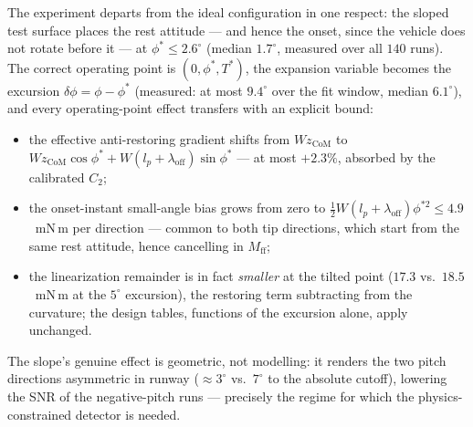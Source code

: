 The experiment departs from the ideal configuration in one respect:
the sloped test surface places the rest attitude — and hence the onset,
since the vehicle does not rotate before it — at
$\phi^* \le 2.6^\circ$ (median $1.7^\circ$, measured over all $140$
runs). The correct operating point is $(0,\phi^*,T^*)$, the expansion
variable becomes the excursion $\delta\phi = \phi - \phi^*$ (measured:
at most $9.4^\circ$ over the fit window, median $6.1^\circ$), and
every operating-point effect transfers with an explicit bound:
\begin{itemize}
\item the effective anti-restoring gradient shifts from
$W z_{\mathrm{CoM}}$ to
$W z_{\mathrm{CoM}}\cos\phi^* + W(l_p{+}\lambda_{\mathrm{off}})\sin\phi^*$
— at most $+2.3\%$, absorbed by the calibrated $C_2$;
\item the onset-instant small-angle bias grows from zero to
$\tfrac12 W(l_p{+}\lambda_{\mathrm{off}})\phi^{*2} \le 4.9$~mN\,m per
direction — common to both tip directions, which start from the same
rest attitude, hence cancelling in $M_{\mathrm{ff}}$;
\item the linearization remainder is in fact \emph{smaller} at the
tilted point ($17.3$ vs.\ $18.5$~mN\,m at the $5^\circ$ excursion), the
restoring term subtracting from the curvature; the design tables,
functions of the excursion alone, apply unchanged.
\end{itemize}
The slope's genuine effect is geometric, not modelling: it renders the
two pitch directions asymmetric in runway ($\approx 3^\circ$ vs.\
$7^\circ$ to the absolute cutoff), lowering the SNR of the
negative-pitch runs — precisely the regime for which the
physics-constrained detector is needed.


